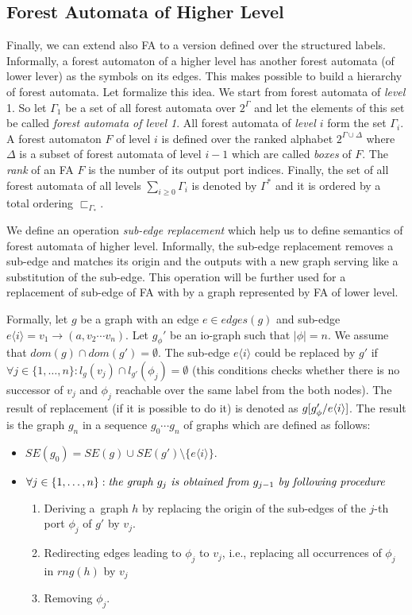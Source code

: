 \subsection{Forest Automata of Higher Level}

Finally, we can extend also FA to a version defined over the structured labels.
Informally, a forest automaton of a higher level has another forest automata (of lower lever) as the symbols on its edges.
This makes possible to build a hierarchy of forest automata.
Let formalize this idea.
We start from forest automata of \emph{level} 1.
So let $\Gamma_1$ be a set of all forest automata over $2^\Gamma$ and let the elements of this set be called \emph{forest automata of level 1}.
All forest automata of \emph{level $i$} form the set $\Gamma_i$.
A forest automaton $F$ of level $i$ is defined over the ranked alphabet $2^{\Gamma \cup \Delta}$ where $\Delta$ is a subset of forest automata of
level $i-1$ which are called \emph{boxes} of $F$.
The \emph{rank} of an FA $F$ is the number of its output port indices.
Finally, the set of all forest automata of all levels $\sum_{i \geq 0} \Gamma_i$ is denoted by $\Gamma^{*}$ and it is ordered by a total ordering $\sqsubset_{\Gamma_*}$.

We define an operation \emph{sub-edge replacement}
which help us to define semantics of forest automata of higher level.
Informally, the sub-edge replacement removes a sub-edge and matches its origin
and the outputs with a new graph serving like a substitution of the sub-edge.
This operation will be further used for a replacement of sub-edge of FA
with by a graph represented by FA of lower level.

Formally, let $g$ be a graph with an edge $e \in edges(g)$ and sub-edge $e\langle i\rangle = v_1 \rightarrow (a,v_2 \cdots v_n)$.
Let $g_{\phi}'$ be an io-graph such that $|\phi| = n$.
We assume that $dom(g) \cap dom(g') = \emptyset$.
The sub-edge $e\langle i\rangle$ could be replaced by $g'$ if $\forall j \in \{1,\ldots,n\}: l_{g}(v_j) \cap
l_{g'}(\phi_j) = \emptyset$
(this conditions checks whether there is no successor of $v_j$ and $\phi_j$ reachable over the same
label from the both nodes).
The result of replacement (if it is possible to do it) is denoted as $g[g'_\phi/e\langle i\rangle]$.
The result is the graph $g_n$ in a sequence $g_0 \cdots g_n$ of graphs which are defined as follows: 
\begin{itemize}
	\item $SE(g_0) = SE(g) \cup SE(g') \setminus \{e\langle i\rangle\}$.
	\item $\forall j \in \{1, \ldots, n\}: \emph{the graph } g_j \emph{ is obtained from } g_{j-1} \emph{ by following procedure }$
		\begin{enumerate}
			\item Deriving a~graph $h$ by replacing the origin of the sub-edges of the $j$-th port $\phi_j$ of $g'$ by $v_j$.
			\item Redirecting edges leading to $\phi_{j}$ to $v_j$, i.e., replacing all occurrences of $\phi_j$ in $rng(h)$ by $v_j$
			\item Removing $\phi_j$. 
		\end{enumerate}
\end{itemize}

